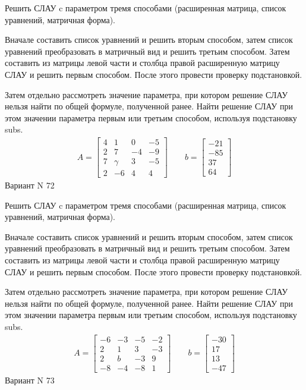 \documentclass[11pt]{report}
\begin{document}
Решить СЛАУ c параметром тремя способами (расширенная матрица, список уравнений, матричная форма).

Вначале составить список уравнений и решить вторым способом,
затем список уравнений преобразовать в матричный вид и решить третьим способом.
Затем составить из матрицы левой части и столбца правой расширенную матрицу СЛАУ и решить первым способом.
После этого провести проверку подстановкой.

Затем отдельно рассмотреть значение параметра, при котором решение СЛАУ нельзя найти по общей формуле,
полученной ранее.
Найти решение СЛАУ при этом значении параметра первым или третьим способом, используя подстановку subs.
\begin{align*}
    A = \left[\begin{matrix}4 & 1 & 0 & -5\\2 & 7 & -4 & -9\\7 & \gamma & 3 & -5\\2 & -6 & 4 & 4\end{matrix}\right]
\qquad b = \left[\begin{matrix}-21\\-85\\37\\64\end{matrix}\right]
\end{align*}
\newpage
Вариант N 72


Решить СЛАУ c параметром тремя способами (расширенная матрица, список уравнений, матричная форма).

Вначале составить список уравнений и решить вторым способом,
затем список уравнений преобразовать в матричный вид и решить третьим способом.
Затем составить из матрицы левой части и столбца правой расширенную матрицу СЛАУ и решить первым способом.
После этого провести проверку подстановкой.

Затем отдельно рассмотреть значение параметра, при котором решение СЛАУ нельзя найти по общей формуле,
полученной ранее.
Найти решение СЛАУ при этом значении параметра первым или третьим способом, используя подстановку subs.
\begin{align*}
    A = \left[\begin{matrix}-6 & -3 & -5 & -2\\2 & 1 & 3 & -3\\2 & b & -3 & 9\\-8 & -4 & -8 & 1\end{matrix}\right]
\qquad b = \left[\begin{matrix}-30\\17\\13\\-47\end{matrix}\right]
\end{align*}
\newpage
Вариант N 73
\end{document}
